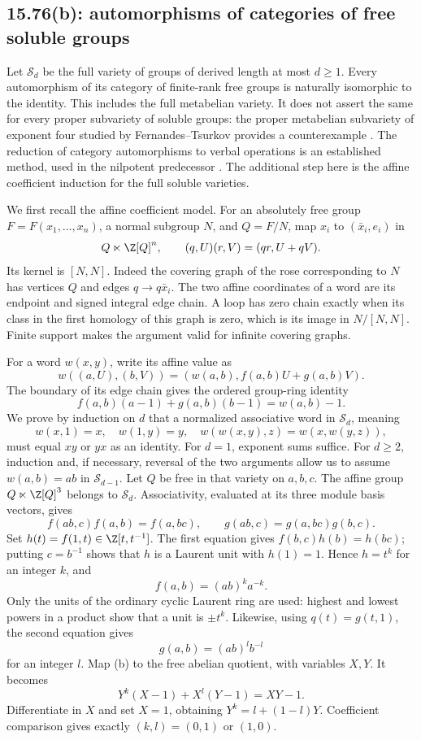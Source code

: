 \subsection{15.76(b): automorphisms of categories of free soluble groups}
\label{cand:15.76}
Let \(\mathcal S_d\) be the full variety of groups of derived length
at most \(d\ge1\). Every automorphism of its category of finite-rank
free groups is naturally isomorphic to the identity.
This includes the full metabelian variety. It does not assert the same
for every proper subvariety of soluble groups: the proper metabelian
subvariety of exponent four studied by Fernandes--Tsurkov provides a counterexample
\cite{fernandes-tsurkov}.
The reduction of category automorphisms to verbal operations is an
established method, used in the nilpotent predecessor
\cite{tsurkov-nilpotent}. The additional step here is the affine
coefficient induction for the full soluble varieties.

We first recall the affine coefficient model. For an absolutely free
group \(F=F(x_1,\ldots,x_n)\), a normal subgroup \(N\), and \(Q=F/N\),
map \(x_i\) to \((\bar x_i,e_i)\) in
\[
 Q\ltimes\Z[Q]^n,\qquad(q,U)(r,V)=(qr,U+qV).
\]
Its kernel is \([N,N]\). Indeed the covering graph of the rose
corresponding to \(N\) has vertices \(Q\) and edges
\(q\to q\bar x_i\). The two affine coordinates of a word are its
endpoint and signed integral edge chain. A loop has zero chain
exactly when its class in the first homology of this graph is zero,
which is its image in \(N/[N,N]\).
Finite support makes the argument valid for infinite covering graphs.

For a word \(w(x,y)\), write its affine value as
\[
 w((a,U),(b,V))=(w(a,b),f(a,b)U+g(a,b)V).
\]
The boundary of its edge chain gives the ordered group-ring identity
\[
 f(a,b)(a-1)+g(a,b)(b-1)=w(a,b)-1.                 \tag{b}
\]
We prove by induction on \(d\) that a normalized associative word in
\(\mathcal S_d\), meaning
\[
 w(x,1)=x,\quad w(1,y)=y,\quad
 w(w(x,y),z)=w(x,w(y,z)),
\]
must equal \(xy\) or \(yx\) as an identity.
For \(d=1\), exponent sums suffice.
For \(d\ge2\), induction and, if necessary, reversal of the two
arguments allow us to assume \(w(a,b)=ab\) in \(\mathcal S_{d-1}\).
Let \(Q\) be free in that variety on \(a,b,c\).
The affine group \(Q\ltimes\Z[Q]^3\) belongs to \(\mathcal S_d\).
Associativity, evaluated at its three module basis vectors, gives
\[
 f(ab,c)f(a,b)=f(a,bc),\qquad
 g(ab,c)=g(a,bc)g(b,c).
\]
Set \(h(t)=f(1,t)\in\Z[t,t^{-1}]\).
The first equation gives \(f(b,c)h(b)=h(bc)\);
putting \(c=b^{-1}\) shows that \(h\) is a Laurent unit with
\(h(1)=1\). Hence \(h=t^k\) for an integer \(k\), and
\[
 f(a,b)=(ab)^ka^{-k}.
\]
Only the units of the ordinary cyclic Laurent ring are used:
highest and lowest powers in a product show that a unit is
\(\pm t^k\). Likewise, using \(q(t)=g(t,1)\), the second equation gives
\[
 g(a,b)=(ab)^lb^{-l}
\]
for an integer \(l\).
Map (b) to the free abelian quotient, with variables \(X,Y\).
It becomes
\[
 Y^k(X-1)+X^l(Y-1)=XY-1.
\]
Differentiate in \(X\) and set \(X=1\), obtaining
\(Y^k=l+(1-l)Y\).
Coefficient comparison gives exactly \((k,l)=(0,1)\) or \((1,0)\).

